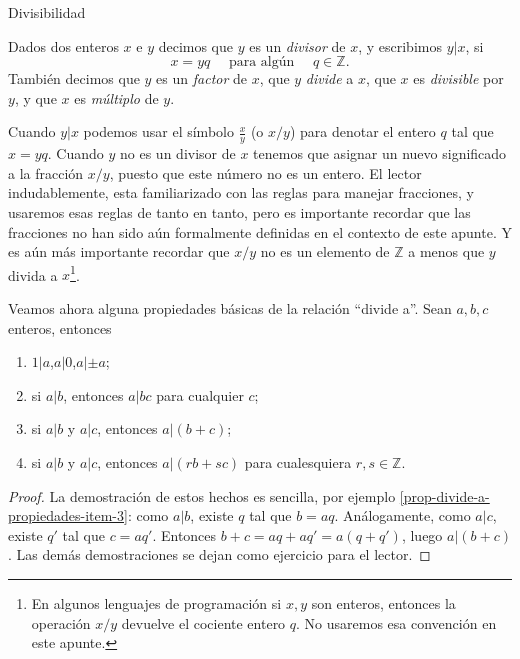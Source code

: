 \begin{section}{Divisibilidad}\label{seccion-divisivilidad}


\begin{definicion}Dados dos enteros $x$ e $y$ decimos que $y$ es un \textit{divisor} de $x$, y escribimos $y|x$, si
$$
x=yq\quad\text{ para algún }\quad q\in \mathbb Z.
$$
También decimos que $y$ es un \textit{factor} de $x$, que $y$ \textit{divide} a $x$, que $x$ es \textit{divisible} por $y$, y que $x$ es \textit{múltiplo} de $y$.
\end{definicion}

Cuando $y|x$ podemos usar el símbolo $\frac{x}{y}$ (o $x/y$) para denotar el entero $q$ tal que $ x=yq$. Cuando $y$ no es un divisor de $x$ tenemos que asignar un nuevo significado a la fracción $x/y$, puesto que este número no es un entero. El lector indudablemente, esta familiarizado con las reglas para manejar
fracciones, y usaremos esas reglas de tanto en tanto, pero es importante recordar que las fracciones no han sido aún formalmente definidas en el contexto de este apunte. Y es aún más importante recordar que $x/y$ no es un elemento de $\mathbb Z$ a menos que $y$ divida a $x$\footnote{En algunos lenguajes de programación si $x,y$ son enteros, entonces la operación $x/y$ devuelve el cociente entero $q$. No usaremos esa convención en este apunte.}.


\begin{observacion}\label{prop-divide-a-propiedades} Veamos ahora alguna propiedades básicas de la relación ``divide a''. Sean $a,b,c$ enteros, entonces
\begin{enumerate}[label=\textit{\alph*)}]
\item\label{prop-divide-a-propiedades-item-1} $1|a$,\qquad $a|0$,\qquad $a|\pm a$;
\item\label{prop-divide-a-propiedades-item-2} si $a|b$, entonces $a|bc$ para cualquier $c$;
\item\label{prop-divide-a-propiedades-item-3} si $a|b$ y $a|c$, entonces $a|(b+c)$;
\item\label{prop-divide-a-propiedades-item-4} si $a|b$ y $a|c$, entonces $a|(rb+sc)$ para cualesquiera $r,s \in \mathbb Z$.
\end{enumerate}
\begin{proof}
La demostración de estos hechos es sencilla, por ejemplo \ref{prop-divide-a-propiedades-item-3}: como $a|b$, existe $q$ tal que $b = aq$. Análogamente, como $a|c$, existe $q'$ tal que $c = aq'$. Entonces $b+c = aq+aq' = a(q+q')$, luego $a|(b+c)$.  
Las demás demostraciones se dejan como ejercicio para el lector. 
\end{proof}
\end{observacion}



\end{section}
